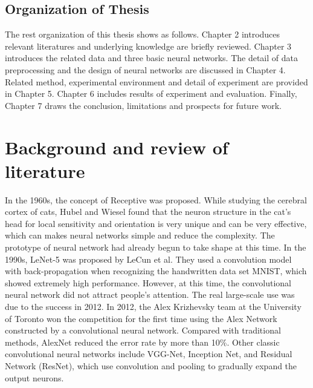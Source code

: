 \section{ Organization of Thesis}

The rest organization of this thesis shows as follows. 
Chapter 2 introduces relevant literatures and underlying knowledge are briefly reviewed. 
Chapter 3 introduces the related data and three basic neural networks. 
The detail of data preprocessing and the design of neural networks are discussed in Chapter 4. 
Related method, experimental environment and detail of experiment  are provided in Chapter 5. 
Chapter 6 includes results of experiment and evaluation. 
Finally, Chapter 7 draws the conclusion, limitations and prospects for future work.









\chapter{Background and review of literature}

In the 1960s, the concept of Receptive was proposed. While studying the cerebral cortex of cats,  Hubel and Wiesel  found that the neuron structure in the cat's head for local sensitivity and orientation is very unique and can be very effective, which can makes  neural networks simple and reduce the complexity. \cite{allman1985stimulus}
The prototype of neural network had already begun to take shape at this time. In the 1990s,  LeNet-5 was proposed by LeCun et al.\cite{el2016cnn} They used a convolution model with back-propagation when recognizing the handwritten data set MNIST, which showed extremely high performance. However, at this time, the convolutional neural network did not attract people's attention. The real large-scale use was due to the success in 2012. 
In 2012, the Alex Krizhevsky team at the University of Toronto won the competition for the first time using the Alex Network constructed by a convolutional neural network.\cite{russakovsky2015imagenet} Compared with traditional methods, AlexNet reduced the error rate by more than 10\%. Other classic convolutional neural networks include VGG-Net, Inception Net, and Residual Network (ResNet), which use convolution and pooling to gradually expand the output neurons.


